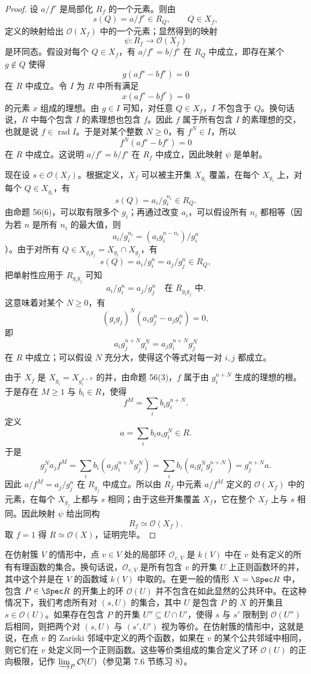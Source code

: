 \begin{proof}
	设 $a/f^r$ 是局部化 $R_f$ 的一个元素。则由
	\[
	s(Q)=a/f^r\in R_Q,
	\qquad Q\in X_f,
	\]
	定义的映射给出 $\mathcal O(X_f)$ 中的一个元素；显然得到的映射
	\[
	\psi:R_f\longrightarrow\mathcal O(X_f)
	\]
	是环同态。假设对每个 $Q\in X_f$，有 $a/f^r=b/f^s$ 在 $R_Q$ 中成立，即存在某个 $g\notin Q$ 使得
	\[
	g(af^s-bf^r)=0
	\]
	在 $R$ 中成立。令 $I$ 为 $R$ 中所有满足
	\[
	x(af^s-bf^r)=0
	\]
	的元素 $x$ 组成的理想。由 $g\in I$ 可知，对任意 $Q\in X_f$，$I$ 不包含于 $Q$。换句话说，$R$ 中每个包含 $I$ 的素理想也包含 $f$。因此 $f$ 属于所有包含 $I$ 的素理想的交，也就是说 $f\in\operatorname{rad}I$。于是对某个整数 $N\ge0$，有 $f^N\in I$，所以
	\[
	f^N(af^s-bf^r)=0
	\]
	在 $R$ 中成立。这说明 $a/f^r=b/f^s$ 在 $R_f$ 中成立，因此映射 $\psi$ 是单射。
	
	现在设 $s\in\mathcal O(X_f)$。根据定义，$X_f$ 可以被主开集 $X_{g_i}$ 覆盖，在每个 $X_{g_i}$ 上，对每个 $Q\in X_{g_i}$，有
	\[
	s(Q)=a_i/g_i^{n_i}\in R_Q.
	\]
	由命题 56(6)，可以取有限多个 $g_i$；再通过改变 $a_i$，可以假设所有 $n_i$ 都相等（因为若 $n$ 是所有 $n_i$ 的最大值，则
	\[
	a_i/g_i^{n_i}=(a_ig_i^{n-n_i})/g_i^n
	\]
	）。由于对所有 $Q\in X_{g_ig_j}=X_{g_i}\cap X_{g_j}$，有
	\[
	s(Q)=a_i/g_i^n=a_j/g_j^n\in R_Q,
	\]
	把单射性应用于 $R_{g_ig_j}$ 可知
	\[
	a_i/g_i^n=a_j/g_j^n\quad\text{在 }R_{g_ig_j}\text{ 中}.
	\]
	这意味着对某个 $N\ge0$，有
	\[
	(g_ig_j)^N(a_ig_j^n-a_jg_i^n)=0,
	\]
	即
	\[
	a_i g_j^{n+N}g_i^N=a_j g_i^{n+N}g_j^N
	\]
	在 $R$ 中成立；可以假设 $N$ 充分大，使得这个等式对每一对 $i,j$ 都成立。
	
	由于 $X_f$ 是 $X_{g_i}=X_{g_i^{n+N}}$ 的并，由命题 56(3)，$f$ 属于由 $g_i^{n+N}$ 生成的理想的根。于是存在 $M\ge1$ 与 $b_i\in R$，使得
	\[
	f^M=\sum_i b_i g_i^{n+N}.
	\]
	定义
	\[
	a=\sum_i b_i a_i g_i^N\in R.
	\]
	于是
	\[
	g_j^N a_j f^M
	=\sum_i b_i(a_j g_i^{n+N}g_j^N)
	=\sum_i b_i(a_i g_i^N g_j^{n+N})
	=g_j^{n+N}a.
	\]
	因此 $a/f^M=a_j/g_j^n$ 在 $R_{g_j}$ 中成立。所以由 $R_f$ 中元素 $a/f^M$ 定义的 $\mathcal O(X_f)$ 中的元素，在每个 $X_{g_j}$ 上都与 $s$ 相同；由于这些开集覆盖 $X_f$，它在整个 $X_f$ 上与 $s$ 相同。因此映射 $\psi$ 给出同构
	\[
	R_f\simeq\mathcal O(X_f).
	\]
	取 $f=1$ 得 $R\simeq\mathcal O(X)$，证明完毕。
\end{proof}

在仿射簇 $V$ 的情形中，点 $v\in V$ 处的局部环 $\mathcal O_{v,V}$ 是 $k(V)$ 中在 $v$ 处有定义的所有有理函数的集合。换句话说，$\mathcal O_{v,V}$ 是所有包含 $v$ 的开集 $U$ 上正则函数环的并，其中这个并是在 $V$ 的函数域 $k(V)$ 中取的。在更一般的情形 $X=\Spec R$ 中，包含 $P\in\Spec R$ 的开集上的环 $\mathcal O(U)$ 并不包含在如此显然的公共环中。在这种情况下，我们考虑所有对 $(s,U)$ 的集合，其中 $U$ 是包含 $P$ 的 $X$ 的开集且 $s\in\mathcal O(U)$。如果存在包含 $P$ 的开集 $U''\subseteq U\cap U'$，使得 $s$ 与 $s'$ 限制到 $\mathcal O(U'')$ 后相同，则把两个对 $(s,U)$ 与 $(s',U')$ 视为等价。在仿射簇的情形中，这就是说，在点 $v$ 的 Zariski 邻域中定义的两个函数，如果在 $v$ 的某个公共邻域中相同，则它们在 $v$ 处定义同一个正则函数。这些等价类组成的集合定义了环 $\mathcal O(U)$ 的正向极限，记作 $\varinjlim_P\mathcal O(U)$（参见第 7.6 节练习 8）。


